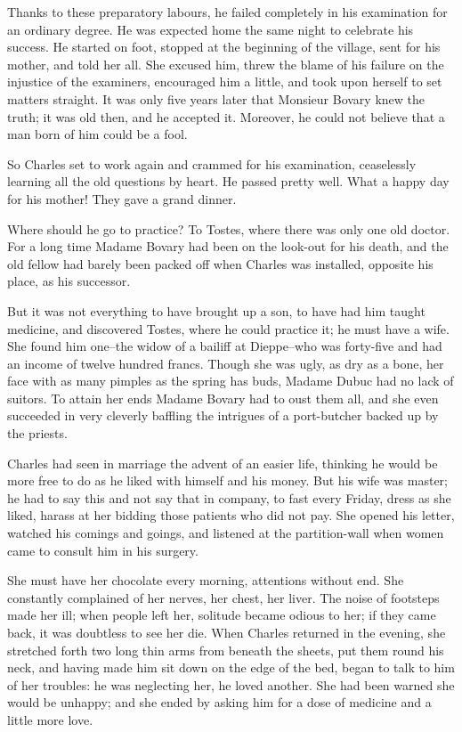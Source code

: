 \documentclass[11pt,twocolumn]{ltugboat}
\begin{document}
Thanks to these preparatory labours, he failed completely in his
examination for an ordinary degree. He was expected home the same night
to celebrate his success. He started on foot, stopped at the beginning
of the village, sent for his mother, and told her all. She excused
him, threw the blame of his failure on the injustice of the examiners,
encouraged him a little, and took upon herself to set matters straight.
It was only five years later that Monsieur Bovary knew the truth; it was
old then, and he accepted it. Moreover, he could not believe that a man
born of him could be a fool.

So Charles set to work again and crammed for his examination,
ceaselessly learning all the old questions by heart. He passed pretty
well. What a happy day for his mother! They gave a grand dinner.

Where should he go to practice? To Tostes, where there was only one old
doctor. For a long time Madame Bovary had been on the look-out for his
death, and the old fellow had barely been packed off when Charles was
installed, opposite his place, as his successor.

But it was not everything to have brought up a son, to have had him
taught medicine, and discovered Tostes, where he could practice it;
he must have a wife. She found him one--the widow of a bailiff at
Dieppe--who was forty-five and had an income of twelve hundred francs.
Though she was ugly, as dry as a bone, her face with as many pimples as
the spring has buds, Madame Dubuc had no lack of suitors. To attain her
ends Madame Bovary had to oust them all, and she even succeeded in
very cleverly baffling the intrigues of a port-butcher backed up by the
priests.

Charles had seen in marriage the advent of an easier life, thinking he
would be more free to do as he liked with himself and his money. But his
wife was master; he had to say this and not say that in company, to fast
every Friday, dress as she liked, harass at her bidding those patients
who did not pay. She opened his letter, watched his comings and goings,
and listened at the partition-wall when women came to consult him in his
surgery.

She must have her chocolate every morning, attentions without end. She
constantly complained of her nerves, her chest, her liver. The noise of
footsteps made her ill; when people left her, solitude became odious to
her; if they came back, it was doubtless to see her die. When Charles
returned in the evening, she stretched forth two long thin arms from
beneath the sheets, put them round his neck, and having made him sit
down on the edge of the bed, began to talk to him of her troubles: he
was neglecting her, he loved another. She had been warned she would be
unhappy; and she ended by asking him for a dose of medicine and a little
more love.
\end{document}
